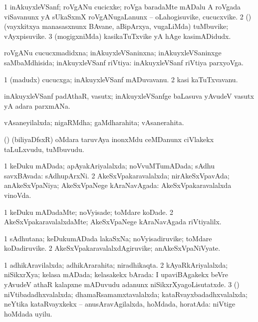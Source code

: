 \bentry
{}
\gl{\nA}
\bmng
\bnum
\num{1} inAkuyxleVSanf; roVgANu cucicxke; roVga baradaMte mADalu A roVgada viSavanunx yA sUkaSxmX roVgANugaLanunx -- oLahogisuvike, cucucxvike. 
\num{2} (\rUpa) (vayxkitxya manasasxnunx BAvane, aBipArxya, \mo vugaLiMda) tuMbuvike; vAyxpisuvike. 
\num{3} (mogigxniMda) kasikaTuTxvike yA hAge kasimADidudx. 
\enum
\emng
\eentry

\bentry
{}
\gl{\gu}
\bmng
roVgANu cucucxmadidxna; inAkuyxleVSaninxna; inAkuyxleVSaninxge saMbaMdhisida; inAkuyxleVSanf riVtiya:  inAkuyxleVSanf riVtiya parxyoVga. 
\emng
\eentry

\bentry
{}
\gl{\nA}
\bmng
\bnum
\num{1} (madudx) cucucxga; inAkuyxleVSanf mADuvavanu. 
\num{2} kasi kaTuTxvavanu. 
\enum
\emng
\eentry

\bentry
{}
\gl{\nA}
\bmng
inAkuyxleVSanf padAthaR, vasutx; inAkuyxleVSanfge baLasuva yAvudeV vasutx yA adara parxmANa. 
\emng
\eentry

\bentry
{}
\gl{\gu}
\bmng
vAsaneyilalxda; nigaRMdha; gaMdharahita; vAsanerahita. 
\emng
\eentry

\bentry
{}
\gl{\nA}
\bmng
(\birx) (biliyaDfsxR) oMdara taruvAya inonxMdu ceMDanunx ciVlakekx taLuLxvudu, tuMbuvudu. 
\emng
\eentry

\bentry
{}
\gl{\gu}
\bmng
\bnum
\num{1} keDuku mADada; apAyakAriyalalxda; noVvuMTumADada; sAdhu savxBAvada:  sAdhupArxNi. 
\num{2} AkeSxVpakaravalalxda; nirAkeSxVpavAda; anAkeSxVpaNiya; AkeSxVpaNege kAraNavAgada:  AkeSxVpakaravalalxda vinoVda. 
\enum
\emng
\eentry

\bentry
{}
\gl{\kirxvi}
\bmng
\bnum
\num{1} keDuku mADadaMte; noVyisade; toMdare koDade. 
\num{2} AkeSxVpakaravalalxdaMte; AkeSxVpaNege kAraNavAgada riVtiyalilx. 
\enum
\emng
\eentry

\bentry
{}
\gl{\nA}
\bmng
\bnum
\num{1} sAdhutana; keDukumADada lakaSxNa; noVyisadiruvike; toMdare koDadiruvike. 
\num{2} AkeSxVpakaravalalxdAgiruvike; anAkeSxVpaNiVyate. 
\enum
\emng
\eentry

\bentry
{}
\gl{\gu}
\bmng
\bnum
\num{1} adhikAravilalxda; adhikArarahita; niradhikaqta. 
\num{2} kAyaRkAriyalalxda; niSikxrXya; kelasa mADada; kelasakekx bArada:  I upaviBAgakekx beVre yAvudeV athaR kalapxne mADuvudu adanunx niSikxrXyagoLisutatxde. 
\num{3} (\nAyxshA) niVtibadadhxvalalxda; dhamaRsamamxtavalalxda; kataRvayxbadadhxvalalxda; neYtika kataRvayxkekx -- anusAravAgilalxda, hoMdada, horatAda:  niVtige hoMdada uyilu. 
\enum
\emng
\eentry

